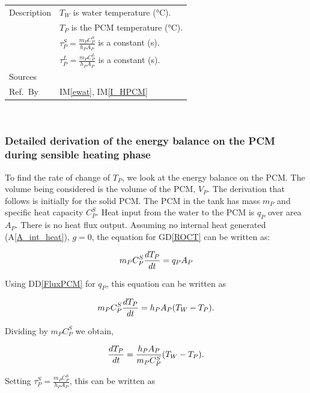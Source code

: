 \documentclass[12pt]{article}
\newcommand{\colAwidth}{0.13\textwidth}
\newcommand{\colBwidth}{0.82\textwidth}
\newcommand{\dref}[1]{GD\ref{#1}}
\newcommand{\ddref}[1]{DD\ref{#1}}
\newcommand{\aref}[1]{A\ref{#1}}
\newcommand{\iref}[1]{IM\ref{#1}}
\begin{document}
\begin{minipage}{\textwidth}
\begin{tabular}{| p{\colAwidth} | p{\colBwidth}|}
  \hline
  Description&$T_W$ is water temperature (\si{\celsius}).\\
  &$T_P$ is the PCM temperature (\si{\celsius}).\\
  &$\tau^S_P = \frac{m_P C^S_P}{h_P A_P}$ is a constant
  (\si{\second}).\\
  &$\tau^L_P = \frac{m_P C^L_P}{h_P A_P}$ is a constant
  (\si{\second}).
  \\
  \hline
  Sources&~\cite{Lightstone2012}\ \\
  \hline
  Ref.\ By & \iref{ewat}, \iref{I_HPCM}\\
  \hline
\end{tabular}
\end{minipage}\\

\subsubsection*{Detailed derivation of the energy balance on the PCM during sensible heating phase}

To find the rate of change of $T_P$, we look at the energy balance on the PCM.
The volume being considered is the volume of the PCM, $V_P$.  The derivation that
follows is initially for the solid PCM.  The PCM in the tank has mass $m_P$ and
specific heat capacity $C^S_P$.  Heat input from the water to the PCM is $q_P$
over area $A_P$.  There is no heat flux output.  Assuming no internal heat
generated (\aref{A_int_heat}), $g=0$, the equation for \dref{ROCT} can be
written as:

\begin{equation*}
\\m_P C_P^S \frac{d T_P}{dt} = q_P A_P
\end{equation*}

\noindent
Using \ddref{FluxPCM} for $q_P$, this equation can be written as

\begin{equation*}
\\m_P C^S_P \frac{dT_P}{dt} = h_P A_P (T_W - T_P).
\end{equation*}

\noindent
Dividing by $m_P C^S_P$ we obtain,

\begin{equation*}
\\\frac{dT_P}{dt} = \frac{h_P A_P}{m_P C^S_P} (T_W - T_P).
\end{equation*}

\noindent
Setting $\tau_P^S = \frac{m_P C_P^S}{h_P A_P}$, this can be written as
\end{document}
